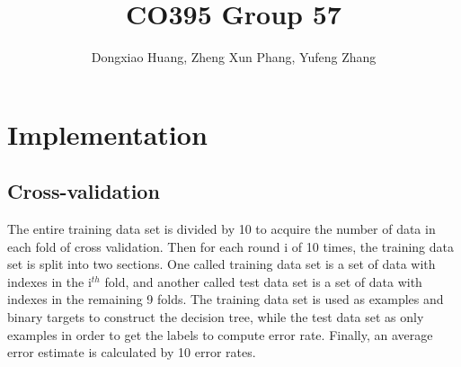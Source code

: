 \documentclass[12pt, a4paper]{article}
\title{CO395 Group 57 \vspace{-1ex}}
\author{Dongxiao Huang, Zheng Xun Phang, Yufeng Zhang}
\date{\vspace{-1.5ex}}
\begin{document}
\maketitle
\section*{Implementation}
\subsection*{Cross-validation}
The entire training data set is divided by 10 to acquire the number of data in each fold of cross validation. Then for each round i of 10 times, the training data set is split into two sections. One called training data set is a set of data with indexes in the i$^{th}$ fold, and another called test data set is a set of data with indexes in the remaining 9 folds. The training data set is used as examples and binary targets to construct the decision tree, while the test data set as only examples in order to get the labels to compute error rate. Finally, an average error estimate is calculated by 10 error rates.
\end{document}
